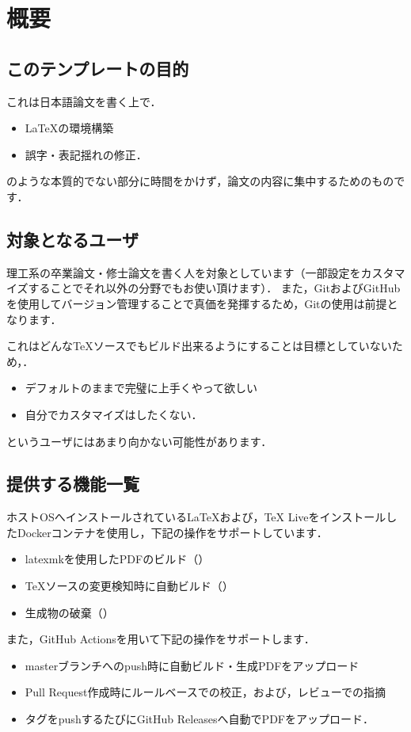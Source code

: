 \documentclass[main]{subfiles}
\begin{document}
\section{概要}

\subsection{このテンプレートの目的}

これは日本語論文を書く上で．

\begin{itemize}
    \item LaTeXの環境構築
    \item 誤字・表記揺れの修正．
\end{itemize}

のような本質的でない部分に時間をかけず，論文の内容に集中するためのものです．

\subsection{対象となるユーザ}
理工系の卒業論文・修士論文を書く人を対象としています（一部設定をカスタマイズすることでそれ以外の分野でもお使い頂けます）．
また，GitおよびGitHubを使用してバージョン管理することで真価を発揮するため，Gitの使用は前提となります．


これはどんなTeXソースでもビルド出来るようにすることは目標としていないため，．

\begin{itemize}
    \item デフォルトのままで完璧に上手くやって欲しい
    \item 自分でカスタマイズはしたくない．
\end{itemize}

というユーザにはあまり向かない可能性があります．

\subsection{提供する機能一覧}

ホストOSへインストールされているLaTeXおよび，TeX LiveをインストールしたDockerコンテナを使用し，下記の操作をサポートしています．

\begin{itemize}
    \item latexmkを使用したPDFのビルド（）
    \item TeXソースの変更検知時に自動ビルド（）
    \item 生成物の破棄（）
\end{itemize}

また，GitHub Actionsを用いて下記の操作をサポートします．

\begin{itemize}
    \item masterブランチへのpush時に自動ビルド・生成PDFをアップロード
    \item Pull Request作成時にルールベースでの校正，および，レビューでの指摘
    \item タグをpushするたびにGitHub Releasesへ自動でPDFをアップロード．
\end{itemize}
\end{document}
